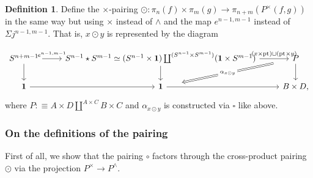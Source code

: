 \documentclass{amsart}
\theoremstyle{definition}
\newtheorem{de}[theorem]{Definition}
\newcommand{\bs}[1]{\mathrm{pt}_{#1}}
\newcommand{\sgtn}{\mathbf{1}}
\newcommand{\join}{\star}
\begin{document}
\begin{de}
    Define the $\times$-pairing $\odot: \pi_n(f) \times \pi_m(g) \to \pi_{n+m}(P^\times(f,g))$ in the same way but using $\times$ instead of $\wedge$ and the map $e^{n-1,m-1}$
    instead of $\Sigma j^{n-1, m-1}$. That is, $x \odot y$ is represented by the diagram

\[\begin{tikzcd}
	{S^{n+m-1}} & {S^{n-1} \join S^{m-1} \simeq (S^{n-1} \times \sgtn) \coprod^{(S^{n-1} \times S^{m-1})} (\sgtn \times S^{m-1})} & P \\
	\sgtn & \sgtn & {B \times D,}
	\arrow["{e^{n-1,m-1}}", from=1-1, to=1-2]
	\arrow[from=1-1, to=2-1]
	\arrow["{(x \times \bs{}) \sqcup (\bs{} \times y)}", from=1-2, to=1-3]
	\arrow[from=1-2, to=2-2]
	\arrow["{\alpha_{x \odot y}}"{description}, shorten <=19pt, shorten >=19pt, Rightarrow, from=1-3, to=2-2]
	\arrow[from=1-3, to=2-3]
	\arrow[from=2-1, to=2-2]
	\arrow[from=2-2, to=2-3]
\end{tikzcd}\]
where $P :\equiv A \times D \coprod^{A \times C} B \times C$ and $\alpha_{x \odot y}$ is constructed via $\square$ like above.

\end{de}

\subsubsection{On the definitions of the pairing}

First of all, we show that the pairing $\circ$ factors through the cross-product pairing $\odot$ via the projection $P^\times \to P^\wedge$.
\end{document}

